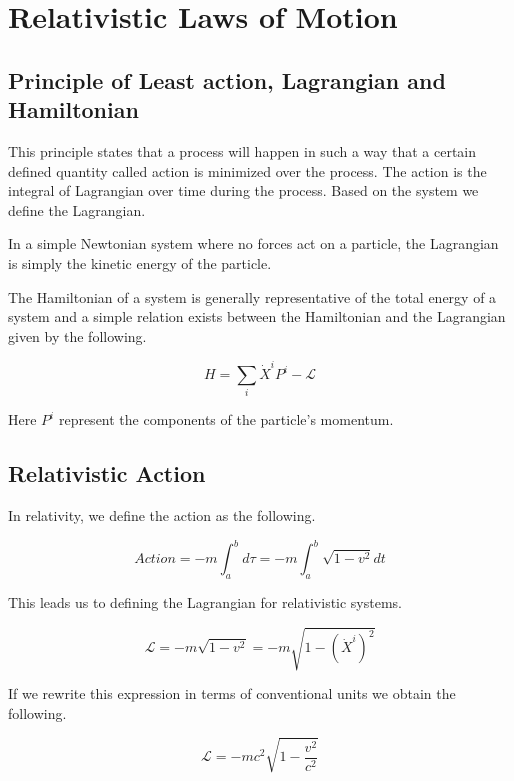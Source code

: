 \documentclass[16pt]{scrartcl}
\numberwithin{equation}{section}
\theoremstyle{plain}
\theoremstyle{definition}
\begin{document}
\section{Relativistic Laws of Motion}

\subsection{Principle of Least action, Lagrangian and Hamiltonian}

This principle states that a process will happen in such a way that a certain defined quantity called action is minimized over the process. The action is the integral of Lagrangian over time during the process. Based on the system we define the Lagrangian.

In a simple Newtonian system where no forces act on a particle, the Lagrangian is simply the kinetic energy of the particle.

The Hamiltonian of a system is generally representative of the total energy of a system and a simple relation exists between the Hamiltonian and the Lagrangian given by the following.

\begin{equation}
    H = \sum_i \dot X^i P^i - \mathcal{L}
    \label{eq:ham-lag}
\end{equation}

Here $P^i$ represent the components of the particle's momentum.

\subsection{Relativistic Action}

In relativity, we define the action as the following.

\begin{equation}
    Action = -m \int_a^b d\tau = -m \int_a^b \sqrt{1-v^2} dt
    \label{eq:rel-action}
\end{equation}

This leads us to defining the Lagrangian for relativistic systems.

\begin{equation}
    \mathcal{L} = -m \sqrt{1 - v^2} = -m \sqrt{1 - (\dot X^i)^2} 
    \label{eq:rel-lagrangian}
\end{equation}

If we rewrite this expression in terms of conventional units we obtain the following.

\begin{equation}
    \mathcal{L} = -mc^2 \sqrt{1 - \frac{v^2}{c^2}}
    \label{eq:rel-lag-conventional}
\end{equation}
\end{document}
